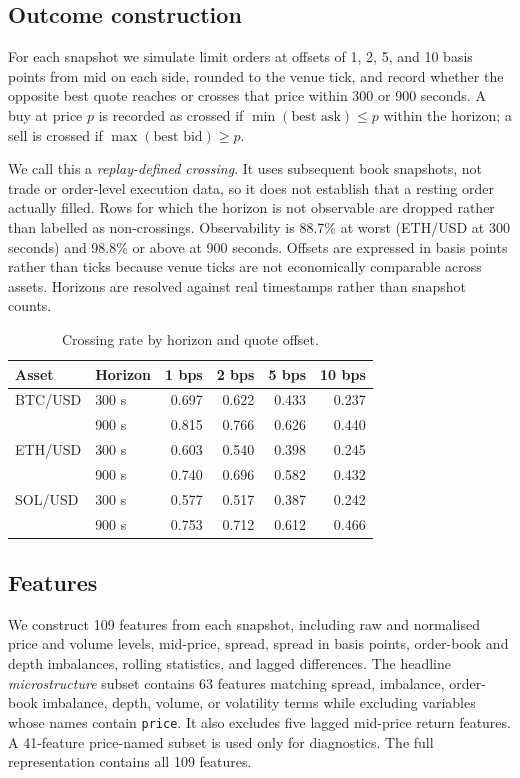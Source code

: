 \documentclass[11pt]{article}
\begin{document}
\subsection{Outcome construction}
For each snapshot we simulate limit orders at offsets of 1, 2, 5, and 10 basis points from mid on each side, rounded to the venue tick, and record whether the opposite best quote reaches or crosses that price within 300 or 900 seconds. A buy at price $p$ is recorded as crossed if $\min(\text{best ask})\le p$ within the horizon; a sell is crossed if $\max(\text{best bid})\ge p$.

We call this a \emph{replay-defined crossing}. It uses subsequent book snapshots, not trade or order-level execution data, so it does not establish that a resting order actually filled. Rows for which the horizon is not observable are dropped rather than labelled as non-crossings. Observability is 88.7\% at worst (ETH/USD at 300 seconds) and 98.8\% or above at 900 seconds. Offsets are expressed in basis points rather than ticks because venue ticks are not economically comparable across assets. Horizons are resolved against real timestamps rather than snapshot counts.

\begin{table}[ht]
\centering
\caption{Crossing rate by horizon and quote offset.}
\begin{tabular}{llrrrr}
\toprule
Asset & Horizon & 1 bps & 2 bps & 5 bps & 10 bps \\
\midrule
BTC/USD & 300 s & 0.697 & 0.622 & 0.433 & 0.237 \\
& 900 s & 0.815 & 0.766 & 0.626 & 0.440 \\
ETH/USD & 300 s & 0.603 & 0.540 & 0.398 & 0.245 \\
& 900 s & 0.740 & 0.696 & 0.582 & 0.432 \\
SOL/USD & 300 s & 0.577 & 0.517 & 0.387 & 0.242 \\
& 900 s & 0.753 & 0.712 & 0.612 & 0.466 \\
\bottomrule
\end{tabular}
\end{table}

\subsection{Features}
We construct 109 features from each snapshot, including raw and normalised price and volume levels, mid-price, spread, spread in basis points, order-book and depth imbalances, rolling statistics, and lagged differences. The headline \emph{microstructure} subset contains 63 features matching spread, imbalance, order-book imbalance, depth, volume, or volatility terms while excluding variables whose names contain \texttt{price}. It also excludes five lagged mid-price return features. A 41-feature price-named subset is used only for diagnostics. The full representation contains all 109 features.
\end{document}

